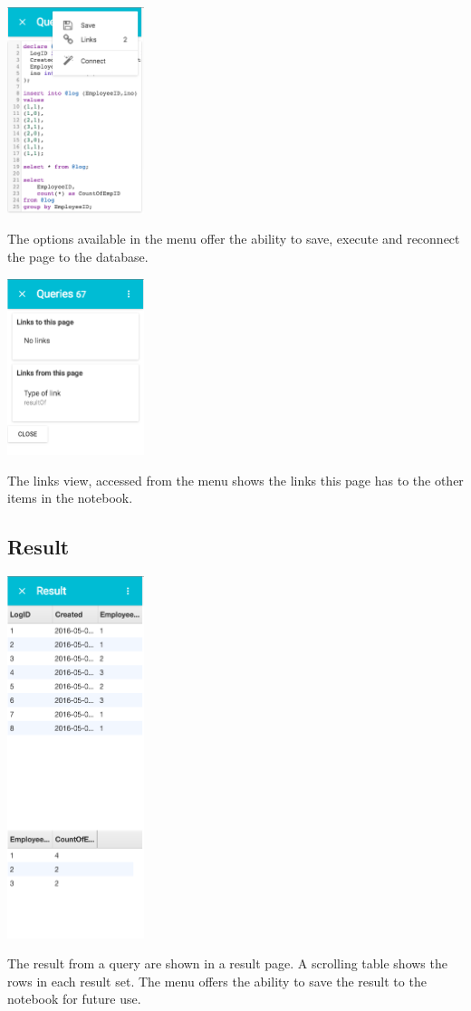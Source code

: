   \begin{center}
  \includegraphics[width=0.3\textwidth]{Figures/Pages-Code-Menu.png}
  \end{center}

  The options available in the menu offer the ability to save, execute and reconnect the page to the database.

  \begin{center}
  \includegraphics[width=0.3\textwidth]{Figures/Pages-Code-Links.png}
  \end{center}

  The links view, accessed from the menu shows the links this page has to the other items in the
  notebook. 

\subsection{Result}

  \begin{center}
  \includegraphics[width=0.3\textwidth]{Figures/Pages-Result.png}
  \end{center}

  The result from a query are shown in a result page. A scrolling table shows the rows in each result set.
  The menu offers the ability to save the result to the notebook for future use.


